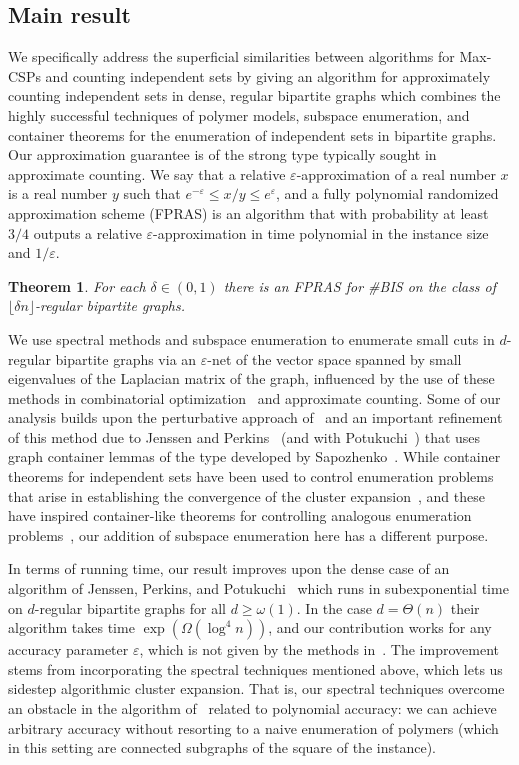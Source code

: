 \documentclass[11pt,letterpaper]{amsart}
\newtheorem{theorem}{Theorem}
\theoremstyle{definition}
\newcommand{\eps}{\varepsilon}
\begin{document}
\subsection{Main result}

We specifically address the superficial similarities between algorithms for Max-CSPs and counting independent sets by giving an algorithm for approximately counting independent sets in dense, regular bipartite graphs which combines the highly successful techniques of polymer models, subspace enumeration, and container theorems for the enumeration of independent sets in bipartite graphs. Our approximation guarantee is of the strong type typically sought in approximate counting. We say that a relative $\eps$-approximation of a real number $x$ is a real number $y$ such that $e^{-\eps} \le x/y \le e^{\eps}$, and a fully polynomial randomized approximation scheme (FPRAS) is an algorithm that with probability at least $3/4$ outputs a relative $\eps$-approximation in time polynomial in the instance size and $1/\eps$.


\begin{theorem}\label{thm:main}
    For each $\delta\in(0,1)$ there is an FPRAS for \#BIS on the class of $\lfloor \delta n\rfloor$-regular bipartite graphs.
\end{theorem}



We use spectral methods and subspace enumeration to enumerate small cuts in $d$-regular bipartite graphs via an $\eps$-net of the vector space spanned by small eigenvalues of the Laplacian matrix of the graph, influenced by the use of these methods in combinatorial optimization~\cite{ABS10,Kol10,KT07} and approximate counting. 
Some of our analysis builds upon the perturbative approach of~\cite{HPR19a,JKP19b} and
an important refinement of this method due to Jenssen and Perkins~\cite{JP20} (and with Potukuchi~\cite{JPP21}) that uses graph container lemmas of the type developed by Sapozhenko~\cite{S87,S01b}. 
While container theorems for independent sets have been used to control enumeration problems that arise in establishing the convergence of the cluster expansion~\cite{JP20,JPP21,JPP22}, and these have inspired container-like theorems for controlling analogous enumeration problems~\cite{CDF+22a}, our addition of subspace enumeration here has a different purpose. 

In terms of running time, our result improves upon the dense case of an algorithm of Jenssen, Perkins, and Potukuchi~\cite{JPP22} which runs in subexponential time on $d$-regular bipartite graphs for all $d\ge\omega(1)$. In the case $d=\Theta(n)$ their algorithm takes time $\exp(\Omega(\log^4 n))$, and our contribution works for any accuracy parameter $\eps$, which is not given by the methods in~\cite{JPP22}. 
The improvement stems from incorporating the spectral techniques mentioned above, which lets us sidestep algorithmic cluster expansion. 
That is, our spectral techniques overcome an obstacle in the algorithm of~\cite{JPP22} related to polynomial accuracy: we can achieve arbitrary accuracy without resorting to a naive enumeration of polymers (which in this setting are connected subgraphs of the square of the instance). 
\end{document}
